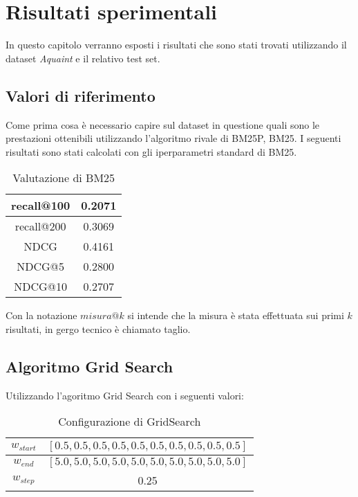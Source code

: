 \chapter{Risultati sperimentali}

In questo capitolo verranno esposti i risultati che sono stati trovati
utilizzando il dataset \textit{Aquaint} e il relativo test set.

\section{Valori di riferimento}
Come prima cosa è necessario capire sul dataset in questione
quali sono le prestazioni ottenibili utilizzando l'algoritmo rivale di BM25P,
BM25. I seguenti risultati sono stati calcolati con gli iperparametri standard
di BM25.

\begin{table}[h!]
	\centering
	\begin{tabular}{|c|c|}
		\hline
		recall@100 & 0.2071 \\
		\hline
		recall@200 & 0.3069 \\
		\hline
		NDCG & 0.4161 \\
		\hline
		NDCG@5 & 0.2800 \\
		\hline
		NDCG@10 & 0.2707 \\
		\hline
	\end{tabular}
\caption{Valutazione di BM25}
\end{table}

Con la notazione $misura@k$ si intende che
la misura è stata effettuata sui primi $k$ risultati, in gergo tecnico
è chiamato taglio.

\section{Algoritmo Grid Search}
Utilizzando l'agoritmo Grid Search con i seguenti valori:

\begin{table}[h!]
	\centering
	\begin{tabular}{|c|c|}
		\hline
		$w_{start}$ & $[0.5, 0.5, 0.5, 0.5, 0.5, 0.5, 0.5, 0.5, 0.5, 0.5]$ \\
		\hline
		$w_{end}$ & $[5.0, 5.0, 5.0, 5.0, 5.0, 5.0, 5.0, 5.0, 5.0, 5.0]$ \\		
		\hline
		$w_{step}$ & 0.25 \\
		\hline
	\end{tabular}
\caption{Configurazione di GridSearch}
\end{table}

